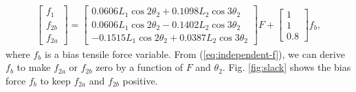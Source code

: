 \documentclass{llncs}
\begin{document}
\begin{align}
	\begin{bmatrix}
		f_1		\\
		f_{2b}	\\
		f_{2a}
	\end{bmatrix} = \begin{bmatrix}
		0.0606L_1\cos2\theta_2+0.1098L_2\cos3\theta_2	\\
		0.0606L_1\cos2\theta_2-0.1402L_2\cos3\theta_2	\\
		-0.1515L_1\cos2\theta_2+0.0387L_2\cos3\theta_2
	\end{bmatrix}F
	+\begin{bmatrix}
		1 \\
		1 \\
		0.8
	\end{bmatrix}f_b,\label{eq:independent-f}
\end{align}
where $f_b$ is a bias tensile force variable.
From (\ref{eq:independent-f}), we can derive $f_b$ to make $f_{2a}$ or $f_{2b}$ zero by a function of $F$ and $\theta_2$.
Fig. \ref{fig:slack} shows the bias force $f_b$ to keep $f_{2a}$ and $f_{2b}$ positive.
\end{document}
